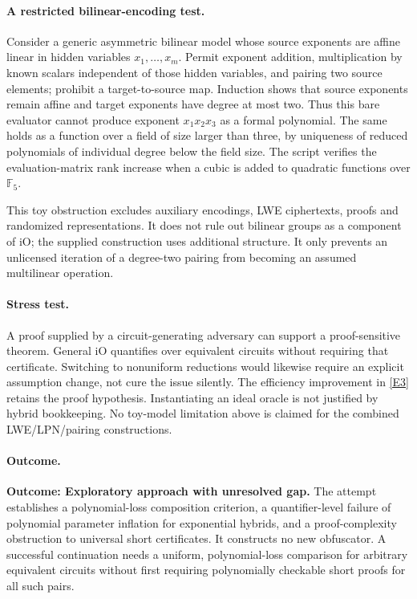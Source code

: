 \documentclass[11pt,a4paper]{article}
\newcommand{\F}{\mathbb{F}}
\newcommand{\eref}[2]{\hyperlink{extra:#1:#2}{[E#2]}}
\numberwithin{equation}{section}
\begin{document}
\paragraph{A restricted bilinear-encoding test.}
Consider a generic asymmetric bilinear model whose source exponents are
affine linear in hidden variables $x_1,\ldots,x_m$. Permit exponent addition,
multiplication by known scalars independent of those hidden variables, and
pairing two source elements; prohibit a target-to-source map. Induction
shows that source exponents remain affine and target exponents have degree
at most two. Thus this bare evaluator cannot produce exponent $x_1x_2x_3$
as a formal polynomial. The same holds as a function over a field of size
larger than three, by uniqueness of reduced polynomials of individual
degree below the field size. The script verifies the evaluation-matrix rank
increase when a cubic is added to quadratic functions over $\F_5$.

This toy obstruction excludes auxiliary encodings, LWE ciphertexts, proofs
and randomized representations. It does not rule out bilinear groups as a
component of iO; the supplied construction uses additional structure. It
only prevents an unlicensed iteration of a degree-two pairing from becoming
an assumed multilinear operation.

\paragraph{Stress test.}
A proof supplied by a circuit-generating adversary can support a
proof-sensitive theorem. General iO quantifies over equivalent circuits
without requiring that certificate. Switching to nonuniform reductions
would likewise require an explicit assumption change, not cure the issue
silently. The efficiency improvement in \eref{statement}{3} retains the proof
hypothesis. Instantiating an ideal oracle is not justified by hybrid
bookkeeping. No toy-model limitation above is claimed for the combined
LWE/LPN/pairing constructions.

\paragraph{Outcome.}
\textbf{Outcome: Exploratory approach with unresolved gap.}
The attempt establishes a polynomial-loss composition criterion, a
quantifier-level failure of polynomial parameter inflation for exponential
hybrids, and a proof-complexity obstruction to universal short certificates.
It constructs no new obfuscator. A successful continuation needs a uniform,
polynomial-loss comparison for arbitrary equivalent circuits without first
requiring polynomially checkable short proofs for all such pairs.
\end{document}
